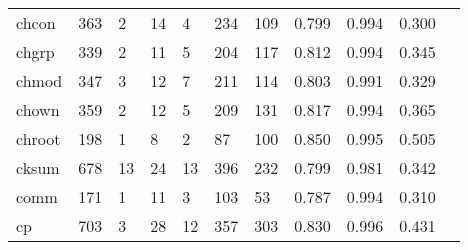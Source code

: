 \begin{longtable}{lp{1.10cm}p{1.10cm}p{1.10cm}p{1.10cm}p{1.10cm}p{1.10cm}p{1.10cm}p{1.10cm}p{1.10cm}p{1.10cm}}
chcon     &                    363 &                                  2 &                                14 &                                4 &                               234 &                             109 &                             0.799 &                                 0.994 &                               0.300 \\
chgrp     &                    339 &                                  2 &                                11 &                                5 &                               204 &                             117 &                             0.812 &                                 0.994 &                               0.345 \\
chmod     &                    347 &                                  3 &                                12 &                                7 &                               211 &                             114 &                             0.803 &                                 0.991 &                               0.329 \\
chown     &                    359 &                                  2 &                                12 &                                5 &                               209 &                             131 &                             0.817 &                                 0.994 &                               0.365 \\
chroot    &                    198 &                                  1 &                                 8 &                                2 &                                87 &                             100 &                             0.850 &                                 0.995 &                               0.505 \\
cksum     &                    678 &                                 13 &                                24 &                               13 &                               396 &                             232 &                             0.799 &                                 0.981 &                               0.342 \\
comm      &                    171 &                                  1 &                                11 &                                3 &                               103 &                              53 &                             0.787 &                                 0.994 &                               0.310 \\
cp        &                    703 &                                  3 &                                28 &                               12 &                               357 &                             303 &                             0.830 &                                 0.996 &                               0.431 \\

\end{longtable}
